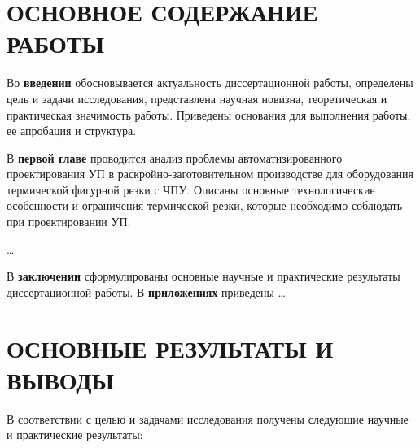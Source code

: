 \documentclass[14pt]{extarticle}
\begin{document}
\section*{ОСНОВНОЕ СОДЕРЖАНИЕ РАБОТЫ}
Во {\bf введении} 
обосновывается актуальность диссертационной работы, 
определены цель и задачи исследования, 
представлена научная новизна, теоретическая и практическая значимость работы. 
Приведены основания для выполнения работы, ее апробация и структура.

В {\bf первой главе} 
проводится анализ проблемы автоматизированного проектирования УП 
в раскройно-заготовительном производстве для оборудования термической фигурной резки с ЧПУ. 
Описаны основные технологические особенности и ограничения термической резки, 
которые необходимо соблюдать при проектировании УП.

\dots


В {\bf заключении} 
сформулированы основные научные и практические результаты
диссертационной работы.
В {\bf приложениях} 
приведены \dots

\section*{ОСНОВНЫЕ РЕЗУЛЬТАТЫ И ВЫВОДЫ}
В соответствии с целью и задачами исследования получены следующие
научные и практические результаты:
\end{document}
